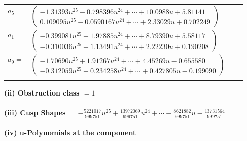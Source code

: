 \documentclass[1p]{elsarticle_modified}
\theoremstyle{definition}
\begin{document}
\begin{tabular}{m{7pt} m{180pt} m{7pt} m{180pt} }
\flushright $a_{5}=$&$\begin{pmatrix}-1.31393 u^{25}-0.798396 u^{24}+\cdots+10.0988 u+5.81141\\0.109095 u^{25}-0.0590167 u^{24}+\cdots+2.33029 u+0.702249\end{pmatrix}$ \\
\flushright $a_{1}=$&$\begin{pmatrix}-0.399081 u^{25}-1.97885 u^{24}+\cdots+8.79390 u+5.58117\\-0.310036 u^{25}+1.13491 u^{24}+\cdots+2.22230 u+0.190208\end{pmatrix}$ \\
\flushright $a_{9}=$&$\begin{pmatrix}-1.70690 u^{25}+1.91267 u^{24}+\cdots+4.45269 u-0.655580\\-0.312059 u^{25}+0.234258 u^{24}+\cdots+0.427805 u-0.199090\end{pmatrix}$\\&\end{tabular}
\flushleft \textbf{(ii) Obstruction class $= 1$}\\~\\
\flushleft \textbf{(iii) Cusp Shapes $= -\frac{5221017}{999751} u^{25}+\frac{13972069}{999751} u^{24}+\cdots-\frac{8621882}{999751} u-\frac{13731564}{999751}$}\\~\\
\newpage\renewcommand{\arraystretch}{1}
\flushleft \textbf{(iv) u-Polynomials at the component}\newline \\
\end{document}
